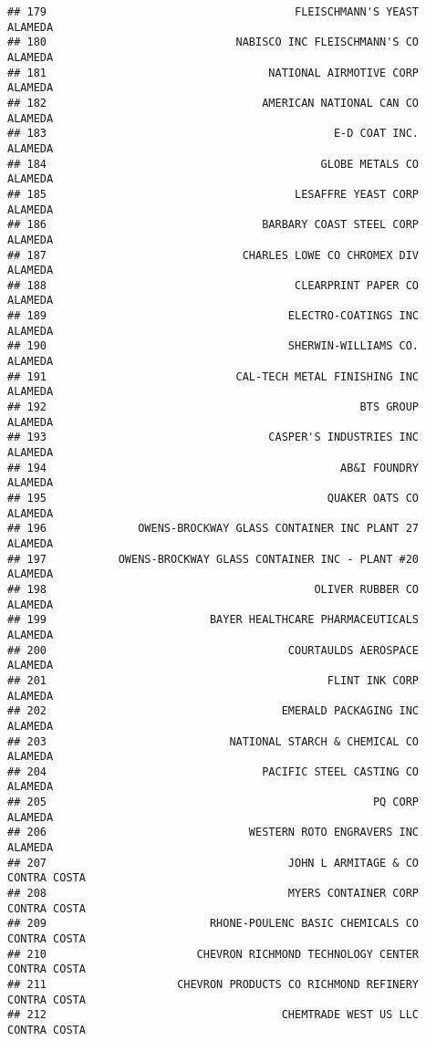 \documentclass[
]{book}
\begin{document}
\begin{verbatim}
## 179                                      FLEISCHMANN'S YEAST       ALAMEDA
## 180                             NABISCO INC FLEISCHMANN'S CO       ALAMEDA
## 181                                  NATIONAL AIRMOTIVE CORP       ALAMEDA
## 182                                 AMERICAN NATIONAL CAN CO       ALAMEDA
## 183                                            E-D COAT INC.       ALAMEDA
## 184                                          GLOBE METALS CO       ALAMEDA
## 185                                      LESAFFRE YEAST CORP       ALAMEDA
## 186                                 BARBARY COAST STEEL CORP       ALAMEDA
## 187                              CHARLES LOWE CO CHROMEX DIV       ALAMEDA
## 188                                      CLEARPRINT PAPER CO       ALAMEDA
## 189                                     ELECTRO-COATINGS INC       ALAMEDA
## 190                                     SHERWIN-WILLIAMS CO.       ALAMEDA
## 191                             CAL-TECH METAL FINISHING INC       ALAMEDA
## 192                                                BTS GROUP       ALAMEDA
## 193                                  CASPER'S INDUSTRIES INC       ALAMEDA
## 194                                             AB&I FOUNDRY       ALAMEDA
## 195                                           QUAKER OATS CO       ALAMEDA
## 196              OWENS-BROCKWAY GLASS CONTAINER INC PLANT 27       ALAMEDA
## 197           OWENS-BROCKWAY GLASS CONTAINER INC - PLANT #20       ALAMEDA
## 198                                         OLIVER RUBBER CO       ALAMEDA
## 199                         BAYER HEALTHCARE PHARMACEUTICALS       ALAMEDA
## 200                                     COURTAULDS AEROSPACE       ALAMEDA
## 201                                           FLINT INK CORP       ALAMEDA
## 202                                    EMERALD PACKAGING INC       ALAMEDA
## 203                            NATIONAL STARCH & CHEMICAL CO       ALAMEDA
## 204                                 PACIFIC STEEL CASTING CO       ALAMEDA
## 205                                                  PQ CORP       ALAMEDA
## 206                               WESTERN ROTO ENGRAVERS INC       ALAMEDA
## 207                                     JOHN L ARMITAGE & CO  CONTRA COSTA
## 208                                     MYERS CONTAINER CORP  CONTRA COSTA
## 209                         RHONE-POULENC BASIC CHEMICALS CO  CONTRA COSTA
## 210                       CHEVRON RICHMOND TECHNOLOGY CENTER  CONTRA COSTA
## 211                    CHEVRON PRODUCTS CO RICHMOND REFINERY  CONTRA COSTA
## 212                                    CHEMTRADE WEST US LLC  CONTRA COSTA

\end{verbatim}
\end{document}
